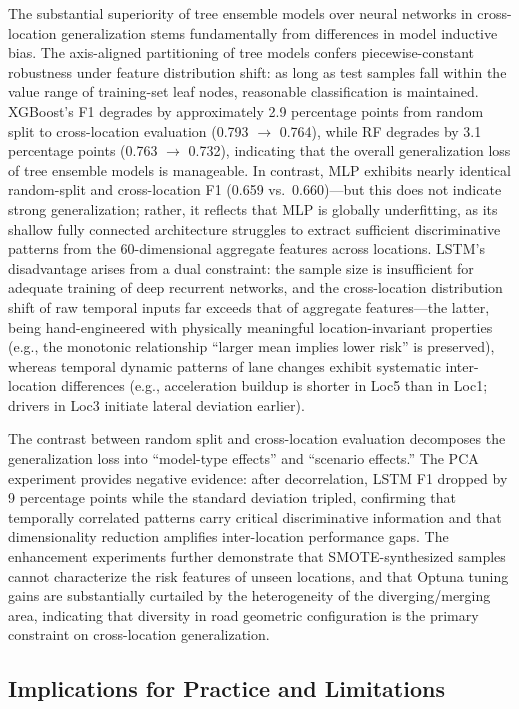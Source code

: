 \documentclass[preprint,review,12pt,a4paper]{elsarticle}
\begin{document}
The substantial superiority of tree ensemble models over neural networks in cross-location generalization stems fundamentally from differences in model inductive bias. The axis-aligned partitioning of tree models confers piecewise-constant robustness under feature distribution shift: as long as test samples fall within the value range of training-set leaf nodes, reasonable classification is maintained. XGBoost's F1 degrades by approximately 2.9 percentage points from random split to cross-location evaluation (0.793 $\to$ 0.764), while RF degrades by 3.1 percentage points (0.763 $\to$ 0.732), indicating that the overall generalization loss of tree ensemble models is manageable. In contrast, MLP exhibits nearly identical random-split and cross-location F1 (0.659 vs.\ 0.660)---but this does not indicate strong generalization; rather, it reflects that MLP is globally underfitting, as its shallow fully connected architecture struggles to extract sufficient discriminative patterns from the 60-dimensional aggregate features across locations. LSTM's disadvantage arises from a dual constraint: the sample size is insufficient for adequate training of deep recurrent networks, and the cross-location distribution shift of raw temporal inputs far exceeds that of aggregate features---the latter, being hand-engineered with physically meaningful location-invariant properties (e.g., the monotonic relationship ``larger mean implies lower risk'' is preserved), whereas temporal dynamic patterns of lane changes exhibit systematic inter-location differences (e.g., acceleration buildup is shorter in Loc5 than in Loc1; drivers in Loc3 initiate lateral deviation earlier).

The contrast between random split and cross-location evaluation decomposes the generalization loss into ``model-type effects'' and ``scenario effects.'' The PCA experiment provides negative evidence: after decorrelation, LSTM F1 dropped by 9 percentage points while the standard deviation tripled, confirming that temporally correlated patterns carry critical discriminative information and that dimensionality reduction amplifies inter-location performance gaps. The enhancement experiments further demonstrate that SMOTE-synthesized samples cannot characterize the risk features of unseen locations, and that Optuna tuning gains are substantially curtailed by the heterogeneity of the diverging/merging area, indicating that diversity in road geometric configuration is the primary constraint on cross-location generalization.

\subsection{Implications for Practice and Limitations}
\end{document}
